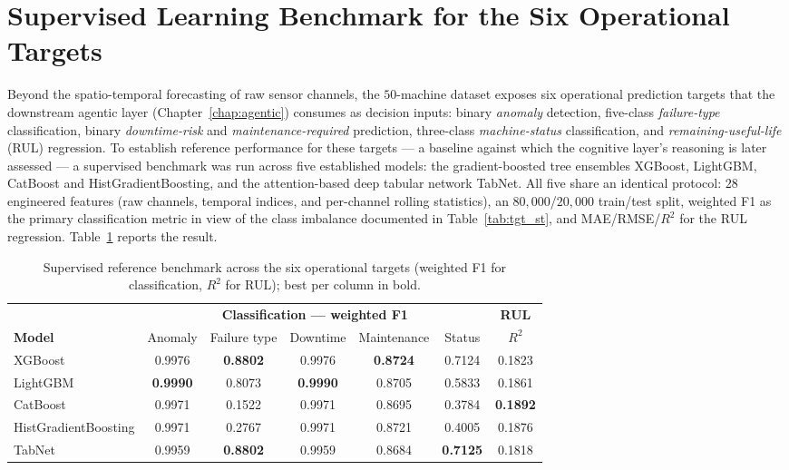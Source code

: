 \section{Supervised Learning Benchmark for the Six Operational Targets}
\label{sec:supervised_benchmark}
Beyond the spatio-temporal forecasting of raw sensor channels, the
$50$-machine dataset exposes six operational prediction targets that the
downstream agentic layer (Chapter~\ref{chap:agentic}) consumes as decision
inputs: binary \emph{anomaly} detection, five-class \emph{failure-type}
classification, binary \emph{downtime-risk} and \emph{maintenance-required}
prediction, three-class \emph{machine-status} classification, and
\emph{remaining-useful-life} (RUL) regression. To establish reference
performance for these targets --- a baseline against which the cognitive
layer's reasoning is later assessed --- a supervised benchmark was run across
five established models: the gradient-boosted tree ensembles XGBoost,
LightGBM, CatBoost and HistGradientBoosting, and the attention-based deep
tabular network TabNet. All five share an identical protocol: $28$ engineered
features (raw channels, temporal indices, and per-channel rolling statistics),
an $80{,}000$/$20{,}000$ train/test split, weighted F1 as the primary
classification metric in view of the class imbalance documented in
Table~\ref{tab:tgt_st}, and MAE/RMSE/$R^2$ for the RUL regression.
Table~\ref{tab:supervised_benchmark} reports the result.

\begin{table}[!htbp]
\centering
\caption{Supervised reference benchmark across the six operational targets (weighted F1 for classification, $R^2$ for RUL); best per column in bold.}
\label{tab:supervised_benchmark}
\small
\renewcommand{\arraystretch}{1.2}
\begin{tabular}{lcccccc}
\toprule
& \multicolumn{5}{c}{\textbf{Classification --- weighted F1}} & \textbf{RUL} \\
\cmidrule(lr){2-6}
\textbf{Model} & Anomaly & Failure type & Downtime & Maintenance & Status & $R^2$ \\
\midrule
XGBoost              & 0.9976 & \textbf{0.8802} & 0.9976 & \textbf{0.8724} & 0.7124 & 0.1823 \\
LightGBM             & \textbf{0.9990} & 0.8073 & \textbf{0.9990} & 0.8705 & 0.5833 & 0.1861 \\
CatBoost             & 0.9971 & 0.1522 & 0.9971 & 0.8695 & 0.3784 & \textbf{0.1892} \\
HistGradientBoosting & 0.9971 & 0.2767 & 0.9971 & 0.8721 & 0.4005 & 0.1876 \\
TabNet               & 0.9959 & \textbf{0.8802} & 0.9959 & 0.8684 & \textbf{0.7125} & 0.1818 \\
\bottomrule
\end{tabular}
\end{table}

